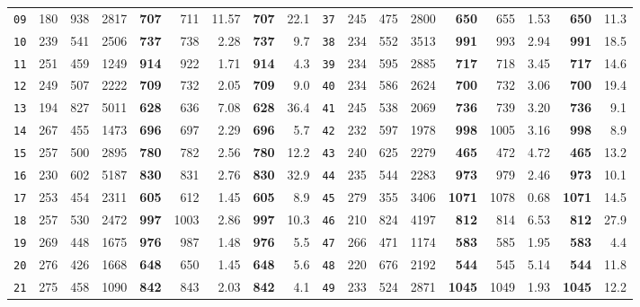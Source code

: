 \documentclass[10pt,a4paper]{article}
\begin{document}
\begin{table}[p!]
{\begin{tabular}{@{}crrrrrrrr@{\hspace{18pt}}crrrrrrrr@{}}
    \texttt{09} & 180 & 938 & 2817 & \textbf{707} & 711 & 11.57 & \textbf{707} & 22.1 & \texttt{37} & 245 & 475 & 2800 & \textbf{650} & 655 & 1.53 & \textbf{650} & 11.3 \\
    \texttt{10} & 239 & 541 & 2506 & \textbf{737} & 738 & 2.28 & \textbf{737} & 9.7 & \texttt{38} & 234 & 552 & 3513 & \textbf{991} & 993 & 2.94 & \textbf{991} & 18.5 \\
    \texttt{11} & 251 & 459 & 1249 & \textbf{914} & 922 & 1.71 & \textbf{914} & 4.3 & \texttt{39} & 234 & 595 & 2885 & \textbf{717} & 718 & 3.45 & \textbf{717} & 14.6 \\
    \texttt{12} & 249 & 507 & 2222 & \textbf{709} & 732 & 2.05 & \textbf{709} & 9.0 & \texttt{40} & 234 & 586 & 2624 & \textbf{700} & 732 & 3.06 & \textbf{700} & 19.4 \\
    \texttt{13} & 194 & 827 & 5011 & \textbf{628} & 636 & 7.08 & \textbf{628} & 36.4 & \texttt{41} & 245 & 538 & 2069 & \textbf{736} & 739 & 3.20 & \textbf{736} & 9.1 \\
    \texttt{14} & 267 & 455 & 1473 & \textbf{696} & 697 & 2.29 & \textbf{696} & 5.7 & \texttt{42} & 232 & 597 & 1978 & \textbf{998} & 1005 & 3.16 & \textbf{998} & 8.9 \\
    \texttt{15} & 257 & 500 & 2895 & \textbf{780} & 782 & 2.56 & \textbf{780} & 12.2 & \texttt{43} & 240 & 625 & 2279 & \textbf{465} & 472 & 4.72 & \textbf{465} & 13.2 \\
    \texttt{16} & 230 & 602 & 5187 & \textbf{830} & 831 & 2.76 & \textbf{830} & 32.9 & \texttt{44} & 235 & 544 & 2283 & \textbf{973} & 979 & 2.46 & \textbf{973} & 10.1 \\
    \texttt{17} & 253 & 454 & 2311 & \textbf{605} & 612 & 1.45 & \textbf{605} & 8.9 & \texttt{45} & 279 & 355 & 3406 & \textbf{1071} & 1078 & 0.68 & \textbf{1071} & 14.5 \\
    \texttt{18} & 257 & 530 & 2472 & \textbf{997} & 1003 & 2.86 & \textbf{997} & 10.3 & \texttt{46} & 210 & 824 & 4197 & \textbf{812} & 814 & 6.53 & \textbf{812} & 27.9 \\
    \texttt{19} & 269 & 448 & 1675 & \textbf{976} & 987 & 1.48 & \textbf{976} & 5.5 & \texttt{47} & 266 & 471 & 1174 & \textbf{583} & 585 & 1.95 & \textbf{583} & 4.4 \\
    \texttt{20} & 276 & 426 & 1668 & \textbf{648} & 650 & 1.45 & \textbf{648} & 5.6 & \texttt{48} & 220 & 676 & 2192 & \textbf{544} & 545 & 5.14 & \textbf{544} & 11.8 \\
    \texttt{21} & 275 & 458 & 1090 & \textbf{842} & 843 & 2.03 & \textbf{842} & 4.1 & \texttt{49} & 233 & 524 & 2871 & \textbf{1045} & 1049 & 1.93 & \textbf{1045} & 12.2 \\

\end{tabular}}
\end{table}
\end{document}
